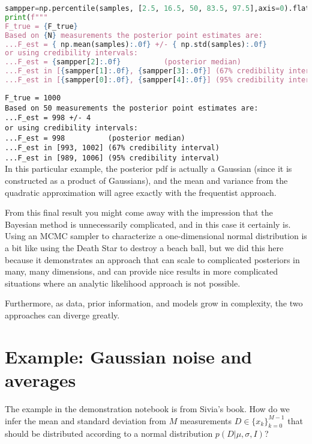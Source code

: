 \documentclass[%
oneside,                 %
final,                   %
10pt]{article}
\begin{document}
\begin{lstlisting}[language=Python,style=blue1]
sampper=np.percentile(samples, [2.5, 16.5, 50, 83.5, 97.5],axis=0).flatten()
print(f"""
F_true = {F_true}
Based on {N} measurements the posterior point estimates are:
...F_est = { np.mean(samples):.0f} +/- { np.std(samples):.0f}
or using credibility intervals:
...F_est = {sampper[2]:.0f}          (posterior median) 
...F_est in [{sampper[1]:.0f}, {sampper[3]:.0f}] (67% credibility interval) 
...F_est in [{sampper[0]:.0f}, {sampper[4]:.0f}] (95% credibility interval) """)
\end{lstlisting}
\Verb!F_true = 1000! \\
\texttt{Based on 50 measurements the posterior point estimates are:} \\
\Verb!...F_est = 998 +/- 4! \\
\texttt{or using credibility intervals:} \\
\Verb!...F_est = 998          (posterior median)!  \\
\Verb!...F_est in [993, 1002] (67%
\Verb!...F_est in [989, 1006] (95%

In this particular example, the posterior pdf is actually a Gaussian (since it is constructed as a product of Gaussians), and the mean and variance from the quadratic approximation will agree exactly with the frequentist approach.

From this final result you might come away with the impression that the Bayesian method is unnecessarily complicated, and in this case it certainly is. Using an MCMC sampler to characterize a one-dimensional normal distribution is a bit like using the Death Star to destroy a beach ball, but we did this here because it demonstrates an approach that can scale to complicated posteriors in many, many dimensions, and can provide nice results in more complicated situations where an analytic likelihood approach is not possible.

Furthermore, as data, prior information, and models grow in complexity, the two approaches can diverge greatly. 



\section{Example: Gaussian noise and averages}
The example in the demonstration notebook is from Sivia's book. How do we infer the mean and standard deviation from $M$ measurements $D \in \{ x_k \}_{k=0}^{M-1}$ that should be distributed according to a normal distribution $p( D | \mu,\sigma,I)$?
\end{document}

